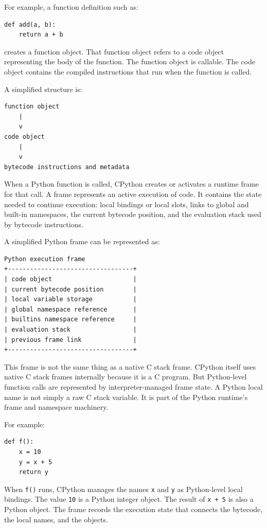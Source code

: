 For example, a function definition such as:

\begin{verbatim}
def add(a, b):
    return a + b
\end{verbatim}

creates a function object. That function object refers to a code object representing the body of the function. The function object is callable. The code object contains the compiled instructions that run when the function is called.

A simplified structure is:

\begin{verbatim}
function object
    |
    v
code object
    |
    v
bytecode instructions and metadata
\end{verbatim}

When a Python function is called, CPython creates or activates a runtime frame for that call. A frame represents an active execution of code. It contains the state needed to continue execution: local bindings or local slots, links to global and built-in namespaces, the current bytecode position, and the evaluation stack used by bytecode instructions.

A simplified Python frame can be represented as:

\begin{verbatim}
Python execution frame
+----------------------------------+
| code object                      |
| current bytecode position        |
| local variable storage           |
| global namespace reference       |
| builtins namespace reference     |
| evaluation stack                 |
| previous frame link              |
+----------------------------------+
\end{verbatim}

This frame is not the same thing as a native C stack frame. CPython itself uses native C stack frames internally because it is a C program. But Python-level function calls are represented by interpreter-managed frame state. A Python local name is not simply a raw C stack variable. It is part of the Python runtime's frame and namespace machinery.

For example:

\begin{verbatim}
def f():
    x = 10
    y = x + 5
    return y
\end{verbatim}

When \texttt{f()} runs, CPython manages the names \texttt{x} and \texttt{y} as Python-level local bindings. The value \texttt{10} is a Python integer object. The result of \texttt{x + 5} is also a Python object. The frame records the execution state that connects the bytecode, the local names, and the objects.

